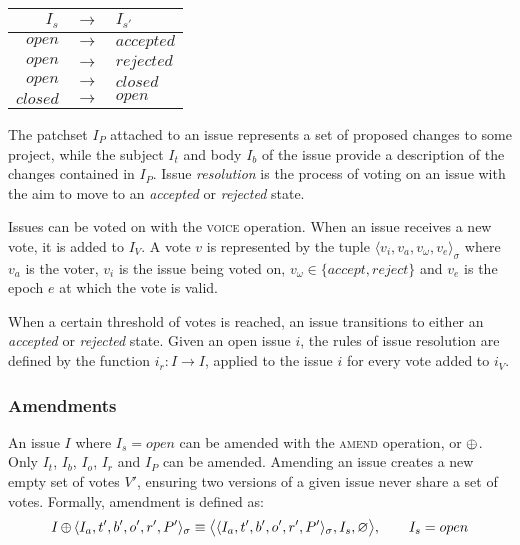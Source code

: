 \begin{table}[hbt]
    \caption{\label{issues-valid-transitions}}
    \begin{tabular}{rcl}
        \toprule
        $I_s$      & $\to$ & $I_{s'}$ \\
        \midrule
        $open$     & $\to$ & $accepted$ \\
        $open$     & $\to$ & $rejected$ \\
        $open$     & $\to$ & $closed$ \\
        $closed$   & $\to$ & $open$ \\
        \bottomrule
    \end{tabular}
\end{table}

The patchset $I_P$ attached to an issue represents a set of proposed changes to
some project, while the subject $I_t$ and body $I_b$ of the issue provide a
description of the changes contained in $I_P$. Issue \emph{resolution} is the
process of voting on an issue with the aim to move to an \emph{accepted} or
\emph{rejected} state.

Issues can be voted on with the \textsc{voice} operation. When an issue receives
a new vote, it is added to $I_V$. A vote $v$ is represented by the tuple
$\langle v_i, v_a, v_{\omega}, v_e \rangle_{\sigma}$ where $v_a$ is the voter,
$v_i$ is the issue being voted on, $v_{\omega} \in \{accept, reject\}$ and
$v_e$ is the epoch $e$ at which the vote is valid.

When a certain threshold of votes is reached, an issue transitions to either an
\emph{accepted} or \emph{rejected} state. Given an open issue $i$, the rules of
issue resolution are defined by the function $i_r : I \to I$, applied to the
issue $i$ for every vote added to $i_V$.

\subsubsection{Amendments}

An issue $I$ where $I_s = open$ can be amended with the \textsc{amend}
operation, or $\operatorname{\oplus}$. Only $I_t$, $I_b$, $I_o$, $I_r$ and $I_P$ can be
amended.  Amending an issue creates a new empty set of votes $V'$, ensuring two
versions of a given issue never share a set of votes. Formally, amendment is
defined as:
\begin{align*}
    I \operatorname{\oplus}{} \langle I_a, t', b', o', r', P' \rangle_{\sigma} \equiv
    \big<\langle I_a, t', b', o', r', P' \rangle_{\sigma}, I_s, \varnothing
    \big>, \qquad I_s = open
\end{align*}

